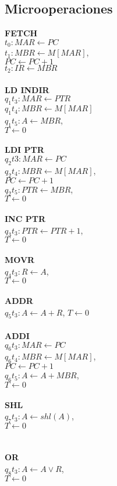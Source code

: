 \documentclass{article}
\begin{document}
\subsection*{Microoperaciones}
\begin{multicols}{2}
\textbf{FETCH}\\
$t_0:MAR \leftarrow PC$\\
$t_1: MBR \leftarrow M[MAR]$,  \\  $PC \leftarrow PC +1$\\
$t_2: IR \leftarrow MBR$\\\\

\noindent \textbf{LD INDIR}\\
$q_1t_3: MAR \leftarrow PTR$\\
$q_1t_4: MBR \leftarrow M[MAR]$\\
$q_1t_5: A\leftarrow MBR$,\\
$T\leftarrow 0$\\\\

\noindent \textbf{LDI PTR}\\
$q_2t3: MAR \leftarrow PC$\\
$q_2t_4: MBR\leftarrow M[MAR]$, \\ $PC \leftarrow PC +1$\\
$q_2t_5: PTR \leftarrow MBR$,\\
$T \leftarrow 0$\\\\

\noindent \textbf{INC PTR}\\
$q_3t_3: PTR \leftarrow PTR + 1$,\\
$T \leftarrow 0$\\\\

\noindent \textbf{MOVR}\\
$q_4t_3: R\leftarrow A$,\\
$T \leftarrow 0$\\\\

\noindent \textbf{ADDR}\\
$q_5t_3: A\leftarrow A+ R$, $T \leftarrow 0$\\\\
\noindent \textbf{ADDI}\\
$q_6t_3: MAR \leftarrow PC$\\
$q_6t_4: MBR\leftarrow M[MAR]$,\\  $PC \leftarrow PC +1$\\ 
$q_6t_5: A \leftarrow A+MBR$,\\
$T \leftarrow 0$\\\\

\noindent \textbf{SHL}\\
$q_7t_3: A \leftarrow shl(A)$,\\
$T \leftarrow 0$\\\\\\

\noindent \textbf{OR}\\
$q_8t_3: A \leftarrow A \lor R$,\\
$T \leftarrow 0$
\end{multicols}
\end{document}

